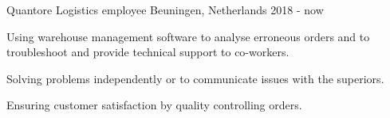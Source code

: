 \begin{cventries}
\cventry
    {Quantore} %
    {Logistics employee} %
    {Beuningen, Netherlands} %
    {2018 - now} %
    {
      \begin{cvitems}
        \item {Using warehouse management software to analyse erroneous orders and to troubleshoot and provide technical support to co-workers.}
        \item {Solving problems independently or to communicate issues with the superiors.}
        \item {Ensuring customer satisfaction by quality controlling orders.}
      \end{cvitems}
    }
    
\end{cventries}

